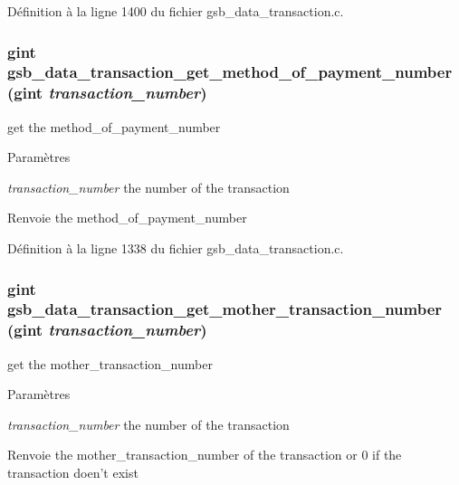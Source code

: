 Définition à la ligne 1400 du fichier gsb\_\-data\_\-transaction.c.

\subsubsection[{gsb\_\-data\_\-transaction\_\-get\_\-method\_\-of\_\-payment\_\-number}]{\setlength{\rightskip}{0pt plus 5cm}gint gsb\_\-data\_\-transaction\_\-get\_\-method\_\-of\_\-payment\_\-number (gint {\em transaction\_\-number})}\label{gsb__data__transaction_8c_aa9bc2b3aba6d0a4df30e0584ab56ede0}
get the method\_\-of\_\-payment\_\-number 
\begin{DoxyParams}{Paramètres}
\item[{\em transaction\_\-number}]the number of the transaction\end{DoxyParams}
\begin{DoxyReturn}{Renvoie}
the method\_\-of\_\-payment\_\-number 
\end{DoxyReturn}


Définition à la ligne 1338 du fichier gsb\_\-data\_\-transaction.c.

\subsubsection[{gsb\_\-data\_\-transaction\_\-get\_\-mother\_\-transaction\_\-number}]{\setlength{\rightskip}{0pt plus 5cm}gint gsb\_\-data\_\-transaction\_\-get\_\-mother\_\-transaction\_\-number (gint {\em transaction\_\-number})}\label{gsb__data__transaction_8c_a6018560ece7ab02e8d46bc9bdaffd607}
get the mother\_\-transaction\_\-number


\begin{DoxyParams}{Paramètres}
\item[{\em transaction\_\-number}]the number of the transaction\end{DoxyParams}
\begin{DoxyReturn}{Renvoie}
the mother\_\-transaction\_\-number of the transaction or 0 if the transaction doen't exist 
\end{DoxyReturn}


